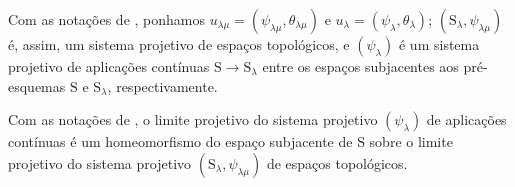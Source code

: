 \begin{env}[8.2.8]
\label{IV.8.2.8}
Com as notações de , ponhamos $u_{\lambda\mu}=(\psi_{\lambda\mu},\theta_{\lambda\mu})$ e $u_\lambda=(\psi_\lambda,\theta_\lambda)$; $(\mathrm{S}_\lambda,\psi_{\lambda\mu})$ é, assim, um sistema projetivo de espaços topológicos, e $(\psi_\lambda)$ é um sistema projetivo de aplicações contínuas $\mathrm{S}\to\mathrm{S}_\lambda$ entre os espaços subjacentes aos pré-esquemas $\mathrm{S}$ e $\mathrm{S}_\lambda$, respectivamente.
\end{env}

\begin{proposition}[8.2.9]
\label{IV.8.2.9}
Com as notações de , o limite projetivo do sistema projetivo $(\psi_\lambda)$ de aplicações contínuas é um homeomorfismo do espaço subjacente de $\mathrm{S}$ sobre o limite projetivo do sistema projetivo $(\mathrm{S}_\lambda,\psi_{\lambda\mu})$ de espaços topológicos.
\end{proposition}

